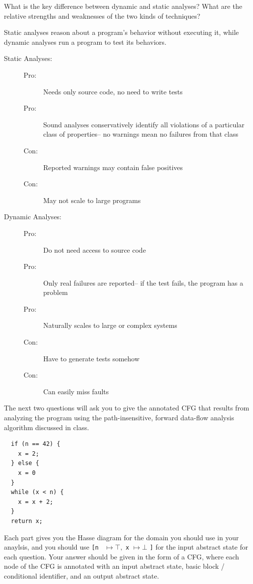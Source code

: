 \documentclass[addpoints, answers]{exam}
\begin{document}
\begin{questions}
\question[2] What is the key difference between dynamic and static
  analyses? What are the relative strengths and weaknesses of the two
  kinds of techniques?
  \begin{solution} %
    Static analyses reason about a program's behavior without
    executing it, while dynamic analyses run a program to test its
    behaviors.
    \begin{description}
    \item[Static Analyses:]
      \begin{description}
      \item[Pro:] Needs only source code, no need to write tests
      \item[Pro:] Sound analyses conservatively identify all
        violations of a particular class of properties-- no warnings
        mean no failures from that class
      \item[Con:] Reported warnings may contain false positives
      \item[Con:] May not scale to large programs
      \end{description}
    \item[Dynamic Analyses:]
      \begin{description}
      \item[Pro:] Do not need access to source code
      \item[Pro:] Only real failures are reported-- if the test fails,
        the program has a problem
      \item[Pro:] Naturally scales to large or complex systems
      \item[Con:] Have to generate tests somehow
      \item[Con:] Can easily miss faults
      \end{description}
    \end{description}
  \end{solution}

\question The next two questions will ask you to give the annotated
  CFG that results from analyzing the program using the
  path-insensitive, forward data-flow analysis algorithm discussed in
  class.
\begin{verbatim}
  if (n == 42) {
    x = 2;
  } else {
    x = 0
  }
  while (x < n) {
    x = x + 2;
  }
  return x;
\end{verbatim}
  Each part gives you the Hasse diagram for the domain you should use
  in your anaylsis, and you should use %
  \texttt{[n } $\mapsto \top, $%
  \texttt{x} $\mapsto \bot$ \texttt{]} for the
  input abstract state for each question. Your answer should be given
  in the form of a CFG, where each node of the CFG is annotated with
  an input abstract state, basic block / conditional identifier, and
  an output abstract state. %


\end{questions}
\end{document}
